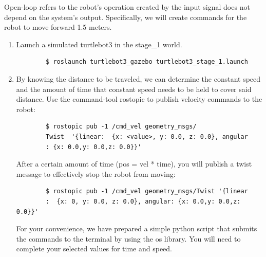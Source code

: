 \documentclass[12pt]{article}
\begin{document}
Open-loop refers to the robot’s operation created by the input signal does not depend on the system’s output. Specifically, we will create commands for the robot to move forward 1.5 meters.
\begin{enumerate}
    \item Launch a simulated turtlebot3 in the stage\_1 world.
    \begin{verbatim}
        $ roslaunch turtlebot3_gazebo turtlebot3_stage_1.launch
    \end{verbatim}
    \item By knowing the distance to be traveled, we can determine the constant speed and the amount of time that constant speed needs to be held to cover said distance. Use the command-tool rostopic to publish velocity commands to the robot:
    \begin{verbatim}
        $ rostopic pub -1 /cmd_vel geometry_msgs/
        Twist  '{linear:  {x: <value>, y: 0.0, z: 0.0}, angular
        : {x: 0.0,y: 0.0,z: 0.0}}'
    \end{verbatim}
    After a certain amount of time (pos = vel * time), you will publish a twist message to effectively stop the robot from moving:

    \begin{verbatim}
        $ rostopic pub -1 /cmd_vel geometry_msgs/Twist '{linear
        :  {x: 0, y: 0.0, z: 0.0}, angular: {x: 0.0,y: 0.0,z: 0.0}}'
    \end{verbatim}
    
    For your convenience, we have prepared a simple python script that submits the commands to the terminal by using the os library. You will need to complete your selected values for time and speed.
    
    
    
\end{enumerate}
\end{document}
